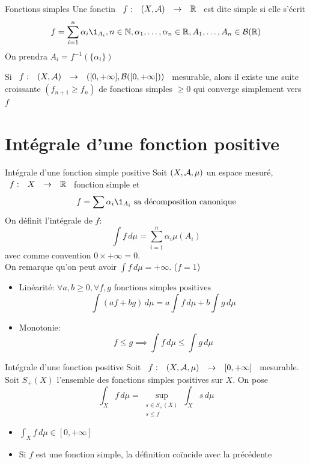 \documentclass[]{report}
\begin{document}
\begin{df}{Fonctions simples}{}
    Une fonctin $\begin{array}{ccccc} f : & (X,\mathcal{A}) & \to & \mathbb{R} \end{array}$ est dite simple si elle s'écrit
    \[f=\sum_{i=1}^{n}\alpha_i \1_{A_i},n\in \N,\alpha_1,\ldots,\alpha_n\in \R,A_1,\ldots,A_n\in \Br(\R)\]
    On prendra $A_i=f^{-1}(\{\alpha_i\})$
\end{df}

\begin{tm}{}{}
    Si $\begin{array}{ccccc} f : & (X,\mathcal{A}) & \to & \left([0,+\infty],\mathcal{B}([0,+\infty])\right) \end{array}$ mesurable, alors il existe une suite croissante $(f_{n+1}\ge f_n)$ de fonctions simples $\ge 0$ qui converge simplement vers $f$
\end{tm}

\section{Intégrale d'une fonction positive}

\begin{df}{Intégrale d'une fonction simple positive}{}
    Soit $(X,\mathcal{A},\mu)$ un espace mesuré, $\begin{array}{ccccc} f : & X & \to & \mathbb{R} \end{array}$ fonction simple et
    \[f=\sum \alpha_i \1_{A_i} \text{ sa décomposition canonique}\]
    On définit l'intégrale de $f$:
    \[\int f \, d\mu=\sum_{i=1}^{n} \alpha_i \mu(A_i)\]
    avec comme convention $0\times +\infty = 0$.\\
    On remarque qu'on peut avoir $\int f\, d\mu=+\infty$. ($f=1$)
\end{df}

\begin{prop}{}{}
    \begin{itemize}
        \item Linéarité: $\forall a,b\ge 0, \forall f,g \text{ fonctions simples positives}$
              \[\int (af+bg)\, d\mu=a\int f\, d\mu + b\int g \, d\mu\]
        \item Monotonie:
              \[f\le g\implies \int f\, d\mu \le \int g \, d\mu\]
    \end{itemize}
\end{prop}

\begin{df}{Intégrale d'une fonction positive}{}
    Soit $\begin{array}{ccccc} f : & (X,\mathcal{A},\mu) & \to & [0,+\infty] \end{array}$ mesurable. Soit $S_+(X)$ l'ensemble des fonctions simples positives sur $X$. On pose
    \[\int_X f\, d\mu=\sup_{\substack{s\in S_+(X)\\ s\le f}}  \int_X s\, d\mu\]
\end{df}

\begin{re}{}{}
    \begin{itemize}
        \item $\int_X f\, d\mu \in [0,+\infty]$
        \item Si $f$ est une fonction simple, la définition coïncide avec la précédente
    \end{itemize}
\end{re}
\end{document}
